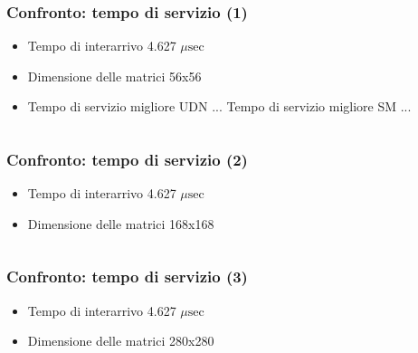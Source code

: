 \documentclass{beamer}
\newcommand{\musec}{$\mu \textrm{sec}$}
\begin{document}
\begin{frame}
  \frametitle{Confronto: tempo di servizio (1)}
  \begin{itemize}
  \item Tempo di interarrivo 4.627 \musec
  \item Dimensione delle matrici 56x56
  \item Tempo di servizio migliore UDN ... Tempo di servizio migliore SM ...
  \end{itemize}
  \begin{columns}
    \resizebox{\columnwidth}{!}{}
    \resizebox{\columnwidth}{!}{}
  \end{columns}
\end{frame}

\begin{frame}
  \frametitle{Confronto: tempo di servizio (2)}
  \begin{itemize}
  \item Tempo di interarrivo 4.627 \musec %
  \item Dimensione delle matrici 168x168
  \end{itemize}
  \begin{columns}
    \resizebox{\columnwidth}{!}{}
    \resizebox{\columnwidth}{!}{}
  \end{columns}
\end{frame}

\begin{frame}
  \frametitle{Confronto: tempo di servizio (3)}
  \begin{itemize}
  \item Tempo di interarrivo 4.627 \musec %
  \item Dimensione delle matrici 280x280
  \end{itemize}
  \begin{columns}
    \resizebox{\columnwidth}{!}{}
    \resizebox{\columnwidth}{!}{}
  \end{columns}
\end{frame}
\end{document}
